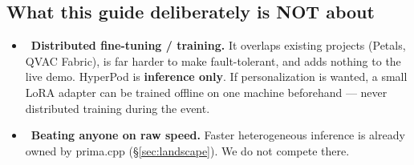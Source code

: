 \subsection{What this guide deliberately is NOT about}
\begin{itemize}[leftmargin=1.4em,nosep]
  \item \Drop\ \textbf{Distributed fine-tuning / training.} It overlaps existing
  projects (Petals, QVAC Fabric), is far harder to make fault-tolerant, and adds
  nothing to the live demo. HyperPod is \textbf{inference only}. If personalization
  is wanted, a small LoRA adapter can be trained offline on one machine
  beforehand --- never distributed training during the event. \HYP
  \item \Drop\ \textbf{Beating anyone on raw speed.} Faster heterogeneous
  inference is already owned by prima.cpp (\S\ref{sec:landscape}). We do not
  compete there.
\end{itemize}
